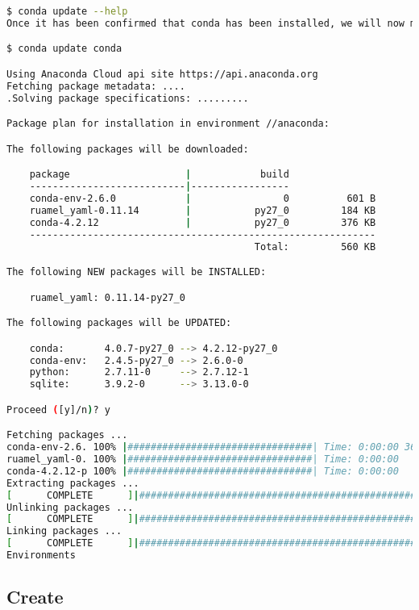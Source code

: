 \begin{lstlisting}[language=bash]
$ conda update --help
Once it has been confirmed that conda has been installed, we will now make sure that it is up to date.

$ conda update conda

Using Anaconda Cloud api site https://api.anaconda.org
Fetching package metadata: ....
.Solving package specifications: .........

Package plan for installation in environment //anaconda:

The following packages will be downloaded:

    package                    |            build
    ---------------------------|-----------------
    conda-env-2.6.0            |                0          601 B
    ruamel_yaml-0.11.14        |           py27_0         184 KB
    conda-4.2.12               |           py27_0         376 KB
    ------------------------------------------------------------
                                           Total:         560 KB

The following NEW packages will be INSTALLED:

    ruamel_yaml: 0.11.14-py27_0

The following packages will be UPDATED:

    conda:       4.0.7-py27_0 --> 4.2.12-py27_0
    conda-env:   2.4.5-py27_0 --> 2.6.0-0
    python:      2.7.11-0     --> 2.7.12-1
    sqlite:      3.9.2-0      --> 3.13.0-0

Proceed ([y]/n)? y

Fetching packages ...
conda-env-2.6. 100% |################################| Time: 0:00:00 360.78 kB/s
ruamel_yaml-0. 100% |################################| Time: 0:00:00   5.53 MB/s
conda-4.2.12-p 100% |################################| Time: 0:00:00   5.84 MB/s
Extracting packages ...
[      COMPLETE      ]|###################################################| 100%
Unlinking packages ...
[      COMPLETE      ]|###################################################| 100%
Linking packages ...
[      COMPLETE      ]|###################################################| 100%
Environments

\end{lstlisting}



\subsection{Create}

